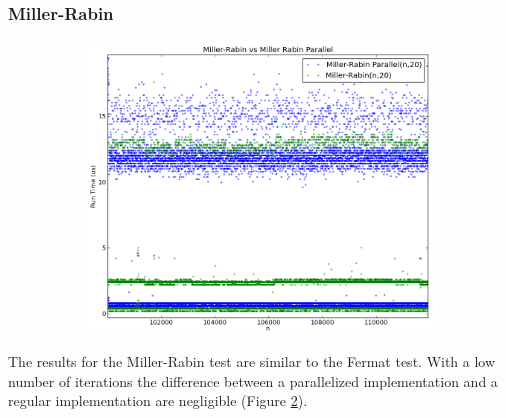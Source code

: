 \documentclass[compressed,final,notitlepage,narroweqnarray,inline,twoside,]{ieee}
\begin{document}
\subsubsection{Miller-Rabin}
\begin{figure}
        \centering
        \begin{subfigure}[b]{0.5\textwidth}
                \includegraphics[width=\textwidth]{../images/MR_MRP_runtime}
                \label{fig:gull}
        \end{subfigure}
        \vspace{-30pt}\caption{}\label{fig:mr_p_comparison_small}
\end{figure}
The results for the Miller-Rabin test are similar to the Fermat test. With a low number of iterations the difference between a parallelized implementation and a regular implementation are negligible (Figure \ref{fig:mr_p_comparison_small}).
\end{document}
